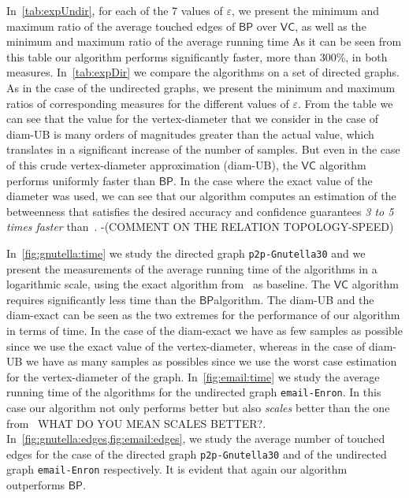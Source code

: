 In~\cref{tab:expUndir}, for each of
the 7 values of $\varepsilon$, we present the minimum and maximum ratio of the
average touched edges of $\mathsf{BP}$ over $\mathsf{VC}$, as well as the
minimum and maximum ratio of the average running time %
As it can be seen from this table our algorithm performs significantly faster,
more than 300\%, in both measures. In~\cref{tab:expDir} we compare the
algorithms on a set of directed graphs. As in the case of the undirected graphs,
we present the minimum and maximum ratios of corresponding measures for the
different values of $\varepsilon$. From the table we can see
that the value for the vertex-diameter that we consider in the case of diam-UB
is many orders of magnitudes greater than the actual value, which translates in
a significant increase of the number of samples. But even in the case of this
crude vertex-diameter approximation (diam-UB), the $\mathsf{VC}$ algorithm
performs uniformly faster than $\mathsf{BP}$. In the case where the exact value
of the diameter was used, we can see that our algorithm computes an estimation
of the betweenness that satisfies the desired accuracy and confidence guarantees
\emph{3 to 5 times faster} than~\citep{BrandesP07}. \XXX-(COMMENT ON THE
RELATION TOPOLOGY-SPEED) 

In~\cref{fig:gnutella:time} we study the directed graph \texttt{p2p-Gnutella30}
and we present the measurements of the average running time of the algorithms in
a logarithmic scale, using the exact algorithm from~\citep{Brandes01} as
baseline. The $\mathsf{VC}$ algorithm requires significantly less time
than the $\mathsf{BP}$algorithm. The diam-UB and the diam-exact can be seen as
the two extremes for the performance of our algorithm in terms of time. In the
case of the diam-exact we have as few samples as possible since we use the exact
value of the vertex-diameter, whereas in the case of diam-UB we have as many
samples as possibles since we use the worst case estimation for the
vertex-diameter of the graph. 
In~\cref{fig:email:time} we study the average running time of the algorithms for
the undirected graph \texttt{email-Enron}. In this case our algorithm not only
performs better but also \emph{scales} better than the one
from~\citep{BrandesP07} \XXX WHAT DO YOU MEAN SCALES BETTER?. 
In~\cref{fig:gnutella:edges,fig:email:edges}, we study the average number of
touched edges for the case of the directed graph \texttt{p2p-Gnutella30} and of
the undirected graph \texttt{email-Enron} respectively. It is evident that again
our algorithm outperforms $\mathsf{BP}$. 

